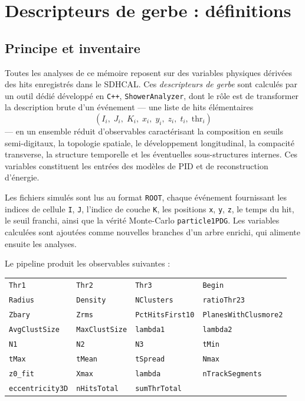 \chapter{Descripteurs de gerbe : définitions}
\label{annexe:showeranalyzer}

\section{Principe et inventaire}

Toutes les analyses de ce mémoire reposent sur des variables physiques dérivées des hits enregistrés dans le SDHCAL. Ces \emph{descripteurs de gerbe} sont calculés par un outil dédié développé en \texttt{C++}, \texttt{ShowerAnalyzer}, dont le rôle est de transformer la description brute d'un événement — une liste de hits élémentaires
\[
(I_i,\;J_i,\;K_i,\;x_i,\;y_i,\;z_i,\;t_i,\;\mathrm{thr}_i)
\]
— en un ensemble réduit d'observables caractérisant la composition en seuils semi-digitaux, la topologie spatiale, le développement longitudinal, la compacité transverse, la structure temporelle et les éventuelles sous-structures internes. Ces variables constituent les entrées des modèles de PID et de reconstruction d'énergie.

Les fichiers simulés sont lus au format \texttt{ROOT}, chaque événement fournissant les indices de cellule \texttt{I}, \texttt{J}, l'indice de couche \texttt{K}, les positions \texttt{x}, \texttt{y}, \texttt{z}, le temps du hit, le seuil franchi, ainsi que la vérité Monte-Carlo \texttt{particle1PDG}. Les variables calculées sont ajoutées comme nouvelles branches d'un arbre enrichi, qui alimente ensuite les analyses.

Le pipeline produit les observables suivantes :

\begin{center}
\small
\begin{tabular}{llll}
\texttt{Thr1} & \texttt{Thr2} & \texttt{Thr3} & \texttt{Begin} \\
\texttt{Radius} & \texttt{Density} & \texttt{NClusters} & \texttt{ratioThr23} \\
\texttt{Zbary} & \texttt{Zrms} & \texttt{PctHitsFirst10} & \texttt{PlanesWithClusmore2} \\
\texttt{AvgClustSize} & \texttt{MaxClustSize} & \texttt{lambda1} & \texttt{lambda2} \\
\texttt{N1} & \texttt{N2} & \texttt{N3} & \texttt{tMin} \\
\texttt{tMax} & \texttt{tMean} & \texttt{tSpread} & \texttt{Nmax} \\
\texttt{z0\_fit} & \texttt{Xmax} & \texttt{lambda} & \texttt{nTrackSegments} \\
\texttt{eccentricity3D} & \texttt{nHitsTotal} & \texttt{sumThrTotal} & \\
\end{tabular}
\end{center}

